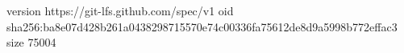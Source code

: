 version https://git-lfs.github.com/spec/v1
oid sha256:ba8e07d428b261a0438298715570e74c00336fa75612de8d9a5998b772effac3
size 75004
